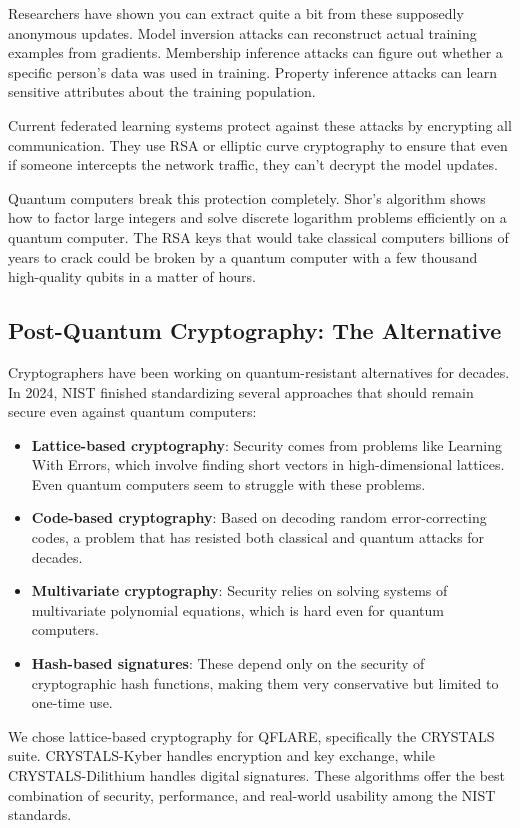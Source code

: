 \documentclass[journal]{IEEEtran}
\begin{document}
Researchers have shown you can extract quite a bit from these supposedly anonymous updates. Model inversion attacks can reconstruct actual training examples from gradients. Membership inference attacks can figure out whether a specific person's data was used in training. Property inference attacks can learn sensitive attributes about the training population.

Current federated learning systems protect against these attacks by encrypting all communication. They use RSA or elliptic curve cryptography to ensure that even if someone intercepts the network traffic, they can't decrypt the model updates.

Quantum computers break this protection completely. Shor's algorithm shows how to factor large integers and solve discrete logarithm problems efficiently on a quantum computer. The RSA keys that would take classical computers billions of years to crack could be broken by a quantum computer with a few thousand high-quality qubits in a matter of hours.

\subsection{Post-Quantum Cryptography: The Alternative}

Cryptographers have been working on quantum-resistant alternatives for decades. In 2024, NIST finished standardizing several approaches that should remain secure even against quantum computers:

\begin{itemize}
\item \textbf{Lattice-based cryptography}: Security comes from problems like Learning With Errors, which involve finding short vectors in high-dimensional lattices. Even quantum computers seem to struggle with these problems.
\item \textbf{Code-based cryptography}: Based on decoding random error-correcting codes, a problem that has resisted both classical and quantum attacks for decades.
\item \textbf{Multivariate cryptography}: Security relies on solving systems of multivariate polynomial equations, which is hard even for quantum computers.
\item \textbf{Hash-based signatures}: These depend only on the security of cryptographic hash functions, making them very conservative but limited to one-time use.
\end{itemize}

We chose lattice-based cryptography for QFLARE, specifically the CRYSTALS suite. CRYSTALS-Kyber handles encryption and key exchange, while CRYSTALS-Dilithium handles digital signatures. These algorithms offer the best combination of security, performance, and real-world usability among the NIST standards.
\end{document}
